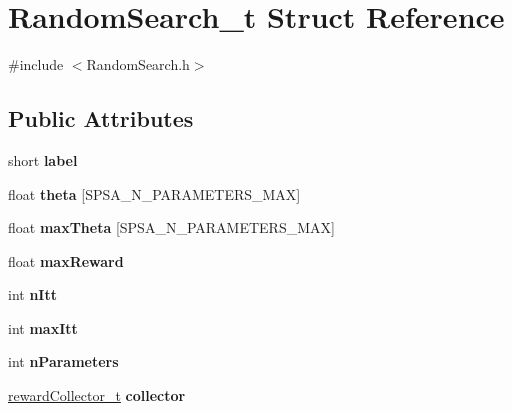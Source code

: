 \hypertarget{structRandomSearch__t}{
\section{RandomSearch\_\-t Struct Reference}
\label{structRandomSearch__t}
}


{\ttfamily \#include $<$RandomSearch.h$>$}

\subsection*{Public Attributes}
\begin{DoxyCompactItemize}
\item 
\hypertarget{structRandomSearch__t_a85fa49f16b79a25adc3f441cd2448534}{
short {\bfseries label}}
\label{structRandomSearch__t_a85fa49f16b79a25adc3f441cd2448534}

\item 
\hypertarget{structRandomSearch__t_aad841dc56f49061a92d20e4b8223db71}{
float {\bfseries theta} \mbox{[}SPSA\_\-N\_\-PARAMETERS\_\-MAX\mbox{]}}
\label{structRandomSearch__t_aad841dc56f49061a92d20e4b8223db71}

\item 
\hypertarget{structRandomSearch__t_ae8eefd1437dc14ef4fb81f17e10b1ef4}{
float {\bfseries maxTheta} \mbox{[}SPSA\_\-N\_\-PARAMETERS\_\-MAX\mbox{]}}
\label{structRandomSearch__t_ae8eefd1437dc14ef4fb81f17e10b1ef4}

\item 
\hypertarget{structRandomSearch__t_a246c89b4c6fb175fe16c8d18e114fbcf}{
float {\bfseries maxReward}}
\label{structRandomSearch__t_a246c89b4c6fb175fe16c8d18e114fbcf}

\item 
\hypertarget{structRandomSearch__t_ad35a336c13f0f4d8681d9d2fe25efe10}{
int {\bfseries nItt}}
\label{structRandomSearch__t_ad35a336c13f0f4d8681d9d2fe25efe10}

\item 
\hypertarget{structRandomSearch__t_a29b27a7fe97f0f92a1d9f56bb8f71bcb}{
int {\bfseries maxItt}}
\label{structRandomSearch__t_a29b27a7fe97f0f92a1d9f56bb8f71bcb}

\item 
\hypertarget{structRandomSearch__t_ab44de1edae8ea149a071a8a0a4de03c9}{
int {\bfseries nParameters}}
\label{structRandomSearch__t_ab44de1edae8ea149a071a8a0a4de03c9}

\item 
\hypertarget{structRandomSearch__t_a1b7da3f8900c4c210c0169483add45e6}{
\hyperlink{structrewardCollector__t}{rewardCollector\_\-t} {\bfseries collector}}
\label{structRandomSearch__t_a1b7da3f8900c4c210c0169483add45e6}

\end{DoxyCompactItemize}


